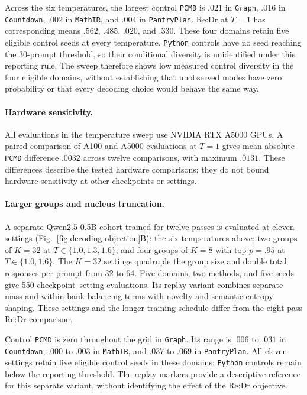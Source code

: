 \documentclass{article}
\newcommand{\1}{\mathbf 1}
\newcommand{\pmd}{\texttt{PCMD}}
\theoremstyle{remark}
\theoremstyle{definition}
\theoremstyle{plain}
\begin{document}
Across the six temperatures, the largest control \pmd{} is $.021$ in
\texttt{Graph}, $.016$ in \texttt{Countdown}, $.002$ in \texttt{MathIR}, and $.004$ in \texttt{PantryPlan}.
Re:Dr at $T=1$ has corresponding means $.562$, $.485$, $.020$, and $.330$.
These four domains retain five eligible control seeds at every temperature.
\texttt{Python} controls have no seed reaching the 30-prompt threshold, so their
conditional diversity is unidentified under this reporting rule.
The sweep therefore shows low measured control diversity in the four
eligible domains, without establishing that unobserved modes have zero
probability or that every decoding choice would behave the same way.

\paragraph{Hardware sensitivity.}
All evaluations in the temperature sweep use NVIDIA RTX A5000 GPUs.
A paired comparison of A100 and A5000 evaluations at $T=1$ gives mean
absolute \pmd{} difference $.0032$ across twelve comparisons, with maximum
$.0131$. These differences describe the tested hardware comparisons;
they do not bound hardware sensitivity at other checkpoints or settings.

\paragraph{Larger groups and nucleus truncation.}
A separate Qwen2.5-0.5B cohort trained for twelve passes is evaluated at
eleven settings (Fig.~\ref{fig:decoding-objection}B): the six temperatures
above; two groups of $K=32$ at $T\in\{1.0,1.3,1.6\}$; and four groups
of $K=8$ with top-$p=.95$ at $T\in\{1.0,1.6\}$. The $K=32$ settings
quadruple the group size and double total responses per prompt from 32 to
64. Five domains, two methods, and five seeds give 550 checkpoint--setting
evaluations. Its replay variant combines separate mass and within-bank
balancing terms with novelty and semantic-entropy shaping. These settings
and the longer training schedule differ from the eight-pass Re:Dr comparison.

Control \pmd{} is zero throughout the grid in \texttt{Graph}. Its range is $.006$
to $.031$ in \texttt{Countdown}, $.000$ to $.003$ in \texttt{MathIR}, and $.037$ to $.069$
in \texttt{PantryPlan}.
All eleven settings retain five eligible control seeds in these domains;
\texttt{Python} controls remain below the reporting threshold. The replay markers
provide a descriptive reference for this separate variant, without
identifying the effect of the Re:Dr objective.
\end{document}
